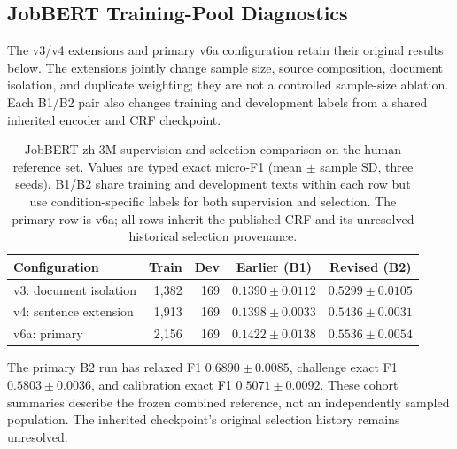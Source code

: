 \subsection{JobBERT Training-Pool Diagnostics}
\label{sec:jobbert-pool-stage2}
The v3/v4 extensions and primary v6a configuration retain their original results below. The extensions jointly change sample size, source composition, document isolation, and duplicate weighting; they are not a controlled sample-size ablation. Each B1/B2 pair also changes training and development labels from a shared inherited encoder and CRF checkpoint.
\begin{table}[H]
\caption{JobBERT-zh 3M supervision-and-selection comparison on the human reference set. Values are typed exact micro-F1 (mean $\pm$ sample SD, three seeds). B1/B2 share training and development texts within each row but use condition-specific labels for both supervision and selection. The primary row is v6a; all rows inherit the published CRF and its unresolved historical selection provenance.}
\label{tab:jobbert-pool-stage2}
\centering
\small
\begin{tabular}{@{}lrrcc@{}}
\toprule
Configuration & Train & Dev & Earlier (B1) & Revised (B2) \\
\midrule
v3: document isolation & 1,382 & 169 & $0.1390\pm0.0112$ & $0.5299\pm0.0105$ \\
v4: sentence extension & 1,913 & 169 & $0.1398\pm0.0033$ & $0.5436\pm0.0031$ \\
v6a: primary & 2,156 & 169 & $0.1422\pm0.0138$ & $\mathbf{0.5536\pm0.0054}$ \\
\bottomrule
\end{tabular}
\end{table}
The primary B2 run has relaxed F1 $0.6890\pm0.0085$, challenge exact F1 $0.5803\pm0.0036$, and calibration exact F1 $0.5071\pm0.0092$. These cohort summaries describe the frozen combined reference, not an independently sampled population. The inherited checkpoint's original selection history remains unresolved.

